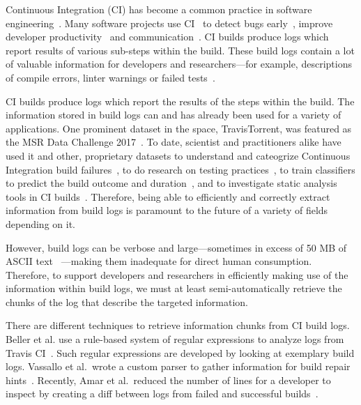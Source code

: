 
Continuous Integration (CI) has become a common practice in software
engineering~\cite{hilton2016usage}.  Many software projects use
CI~\cite{hilton2016usage,staahl2014modeling,beller2017oops} to detect
bugs early~\cite{vasilescu2015quality,duvall2007continuous}, improve
developer productivity~\cite{miller2008hundred,hilton2016usage} and
communication~\cite{downs2012ambient}.  CI builds produce logs which
report results of various sub-steps within the build.  These build logs
contain a lot of valuable information for developers and researchers---for
example, descriptions of compile errors, linter warnings or failed
tests~\cite{beller2017oops,seo2014programmers,vassallo2017a-tale}.

CI builds produce logs which report the results of the steps within the build. The information stored in build logs can and has
already been used for a variety of applications. One prominent dataset
in the space, TravisTorrent, was featured as the MSR Data Challenge
2017~\cite{msr17challenge}. To date, scientist and practitioners alike
have used it and other, proprietary datasets to understand and
cateogrize Continuous Integration build
failures~\cite{islam2017insights}, to do research on testing
practices~\cite{orellana2017differences}, to train classifiers to
predict the build outcome and
duration~\cite{ni2017cost,bisong2017built,machalica2019predictive},
and to investigate static analysis tools in CI
builds~\cite{zampetti2017open}. Therefore, being able to efficiently
and correctly extract information from build logs is paramount to the
future of a variety of fields depending on it.

However, build logs can be verbose and large---sometimes in excess of
50 MB of ASCII text ~\cite{beller2017oops}---making them inadequate
for direct human consumption. Therefore, to support developers and
researchers in efficiently making use of the information within build
logs, we must at least semi-automatically retrieve the chunks of the
log that describe the targeted information.

There are different techniques to retrieve information chunks from CI
build logs. Beller et al. use a rule-based system of regular
expressions to analyze logs from Travis CI~\cite{beller2017oops}.
Such regular expressions are developed by looking at exemplary build
logs.  Vassallo et al.\ wrote a custom parser to gather information
for build repair hints~\cite{vassallo2018un-break}.  Recently, Amar et
al.\ reduced the number of lines for a developer to inspect by
creating a diff between logs from failed and successful
builds~\cite{amar2019mining}.

